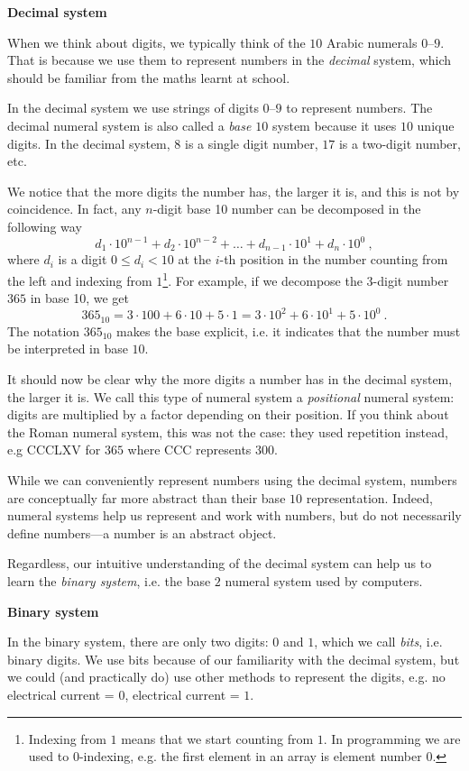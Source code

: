 \documentclass[parskip=half]{scrartcl}
\begin{document}
\textbf{Decimal system}

When we think about digits, we typically think of the $10$ Arabic numerals $0$--$9$.
That is because we use them to represent numbers in the \emph{decimal} system, which should be familiar from the maths learnt at school.

In the decimal system we use strings of digits $0$--$9$ to represent numbers.
The decimal numeral system is also called a \emph{base $10$} system because it uses $10$ unique digits.
In the decimal system, $8$ is a single digit number, $17$ is a two-digit number, etc.

We notice that the more digits the number has, the larger it is, and this is not by coincidence.
In fact, any $n$-digit base 10 number can be decomposed in the following way
\[
  d_1 \cdot 10^{n-1} + d_2 \cdot 10^{n-2} + \dots + d_{n-1} \cdot 10^1 + d_n \cdot 10^0\ ,
\]
where $d_i$ is a digit $0 \le d_i < 10$ at the $i$-th position in the number counting from the left and indexing from $1$\footnote{Indexing from $1$ means that we start counting from $1$. In programming we are used to $0$-indexing, e.g. the first element in an array is element number $0$.}.
For example, if we decompose the $3$-digit number $365$ in base 10, we get
\[
  365_{10} = 3 \cdot 100 + 6 \cdot 10 + 5 \cdot 1 = 3 \cdot 10^2 + 6 \cdot 10^1 + 5 \cdot 10^0\ .
\]
The notation $365_{10}$ makes the base explicit, i.e. it indicates that the number must be interpreted in base $10$.

It should now be clear why the more digits a number has in the decimal system, the larger it is.
We call this type of numeral system a \emph{positional} numeral system: digits are multiplied by a factor depending on their position.
If you think about the Roman numeral system, this was not the case: they used repetition instead, e.g CCCLXV for $365$ where CCC represents $300$.

While we can conveniently represent numbers using the decimal system, numbers are conceptually far more abstract than their base $10$ representation.
Indeed, numeral systems help us represent and work with numbers, but do not necessarily define numbers---a number is an abstract object.

Regardless, our intuitive understanding of the decimal system can help us to learn the \textit{binary system}, i.e. the base $2$ numeral system used by computers.

\textbf{Binary system}

In the binary system, there are only two digits: $0$ and $1$, which we call \emph{bits}, i.e. binary digits.
We use bits because of our familiarity with the decimal system, but we could (and practically do) use other methods to represent the digits, e.g. no electrical current = $0$, electrical current = $1$.
\end{document}
